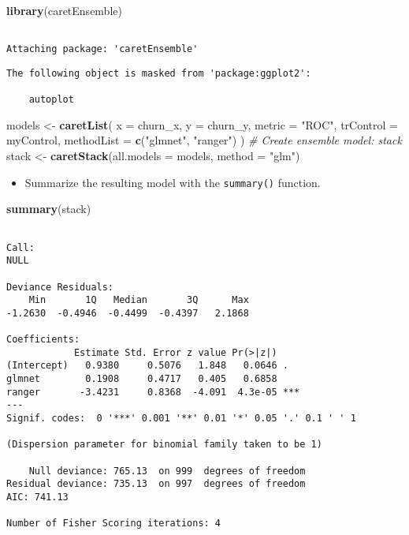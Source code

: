 \documentclass[
]{book}
\newenvironment{Shaded}{\begin{snugshade}}{\end{snugshade}}
\newcommand{\CommentTok}[1]{\textcolor[rgb]{0.56,0.35,0.01}{\textit{#1}}}
\newcommand{\DataTypeTok}[1]{\textcolor[rgb]{0.13,0.29,0.53}{#1}}
\newcommand{\KeywordTok}[1]{\textcolor[rgb]{0.13,0.29,0.53}{\textbf{#1}}}
\newcommand{\NormalTok}[1]{#1}
\newcommand{\StringTok}[1]{\textcolor[rgb]{0.31,0.60,0.02}{#1}}
\providecommand{\tightlist}{%
  \setlength{\itemsep}{0pt}\setlength{\parskip}{0pt}}
\begin{document}
\begin{Shaded}
\begin{Highlighting}[]
\KeywordTok{library}\NormalTok{(caretEnsemble)}
\end{Highlighting}
\end{Shaded}

\begin{verbatim}

Attaching package: 'caretEnsemble'
\end{verbatim}

\begin{verbatim}
The following object is masked from 'package:ggplot2':

    autoplot
\end{verbatim}

\begin{Shaded}
\begin{Highlighting}[]
\NormalTok{models <-}\StringTok{ }\KeywordTok{caretList}\NormalTok{(}
  \DataTypeTok{x =}\NormalTok{ churn_x, }\DataTypeTok{y =}\NormalTok{ churn_y,}
  \DataTypeTok{metric =} \StringTok{"ROC"}\NormalTok{,}
  \DataTypeTok{trControl =}\NormalTok{ myControl,}
  \DataTypeTok{methodList =} \KeywordTok{c}\NormalTok{(}\StringTok{"glmnet"}\NormalTok{, }\StringTok{"ranger"}\NormalTok{)}
\NormalTok{)}
\CommentTok{# Create ensemble model: stack}
\NormalTok{stack <-}\StringTok{ }\KeywordTok{caretStack}\NormalTok{(}\DataTypeTok{all.models =}\NormalTok{ models, }\DataTypeTok{method =} \StringTok{"glm"}\NormalTok{) }
\end{Highlighting}
\end{Shaded}

\begin{itemize}
\tightlist
\item
  Summarize the resulting model with the \texttt{summary()} function.
\end{itemize}

\begin{Shaded}
\begin{Highlighting}[]
\KeywordTok{summary}\NormalTok{(stack)}
\end{Highlighting}
\end{Shaded}

\begin{verbatim}

Call:
NULL

Deviance Residuals: 
    Min       1Q   Median       3Q      Max  
-1.2630  -0.4946  -0.4499  -0.4397   2.1868  

Coefficients:
            Estimate Std. Error z value Pr(>|z|)    
(Intercept)   0.9380     0.5076   1.848   0.0646 .  
glmnet        0.1908     0.4717   0.405   0.6858    
ranger       -3.4231     0.8368  -4.091  4.3e-05 ***
---
Signif. codes:  0 '***' 0.001 '**' 0.01 '*' 0.05 '.' 0.1 ' ' 1

(Dispersion parameter for binomial family taken to be 1)

    Null deviance: 765.13  on 999  degrees of freedom
Residual deviance: 735.13  on 997  degrees of freedom
AIC: 741.13

Number of Fisher Scoring iterations: 4
\end{verbatim}
\end{document}
